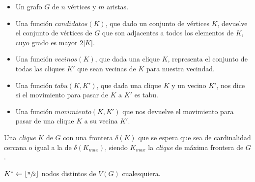 \bigskip

\begin{pseudocodigo}
    \Require\Statex
        \begin{itemize}
            \item Un grafo $G$ de $n$ v\'ertices y $m$ aristas.

            \item Una funci\'on $candidatos(K)$, que dado un conjunto de v\'ertices
                $K$, devuelve el conjunto de v\'ertices de $G$ que son adjacentes
                a todos los elementos de $K$, cuyo grado es mayor $2|K|$.

            \item Una funci\'on $vecinos(K)$, que dada una clique $K$, representa
                el conjunto de todas las cliques $K'$ que sean vecinas de $K$ para
                nuestra vecindad.

            \item Una funci\'on $tabu(K,K')$, que dada una clique $K$ y un vecino $K'$,
                nos dice si el movimiento para pasar de $K$ a $K'$ es tabu.

            \item Una funci\'on $movimiento(K,K')$ que nos devuelve el movimiento
                para pasar de una clique $K$ a su vecina $K'$.
        \end{itemize}
    \Statex
    \Ensure Una \emph{clique} $K$ de $G$ con una frontera $\delta(K)$ que se
        espera que sea de cardinalidad cercana o igual a la de $\delta(K_{max})$,
        siendo $K_{max}$ la \emph{clique} de m\'axima frontera de $G$.

    \Statex

        \State $K^* \gets \lfloor\sfrac{n}{2}\rfloor$ nodos distintos de $V(G)$ cualesquiera.
        \Statex


\end{pseudocodigo}
